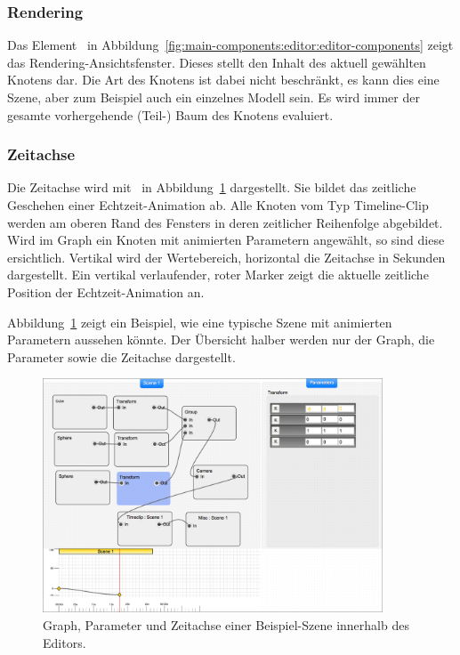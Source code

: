 \subsubsection{Rendering}
\label{ssubsec:main-components:editor:rendering}

Das Element~ in
Abbildung~\ref{fig:main-components:editor:editor-components} zeigt das
Rendering-Ansichtsfenster. Dieses stellt den Inhalt des aktuell gewählten
Knotens dar. Die Art des Knotens ist dabei nicht beschränkt, es kann dies eine
Szene, aber zum Beispiel auch ein einzelnes Modell sein. Es wird immer der
gesamte vorhergehende (Teil-) Baum des Knotens evaluiert.

\subsubsection{Zeitachse}
\label{ssubsec:main-components:editor:timeline}

Die Zeitachse wird mit~ in
Abbildung~\ref{fig:main-components:editor:editor-scene1} dargestellt.  Sie
bildet das zeitliche Geschehen einer Echtzeit-Animation ab. Alle Knoten vom Typ
Timeline-Clip werden am oberen Rand des Fensters in deren zeitlicher
Reihenfolge abgebildet. Wird im Graph ein Knoten mit animierten Parametern
angewählt, so sind diese ersichtlich. Vertikal wird der Wertebereich,
horizontal die Zeitachse in Sekunden dargestellt. Ein vertikal verlaufender,
roter Marker zeigt die aktuelle zeitliche Position der Echtzeit-Animation an.

Abbildung~\ref{fig:main-components:editor:editor-scene1} zeigt ein Beispiel,
wie eine typische Szene mit animierten Parametern aussehen könnte. Der
Übersicht halber werden nur der Graph, die Parameter sowie die Zeitachse
dargestellt.

\begin{figure}[H]
    \centering
    \includegraphics[width=0.9\textwidth]{img/editor_scene1_details.png}
    \caption{Graph, Parameter und Zeitachse einer Beispiel-Szene innerhalb des
        Editors.}\label{fig:main-components:editor:editor-scene1}
\end{figure}

